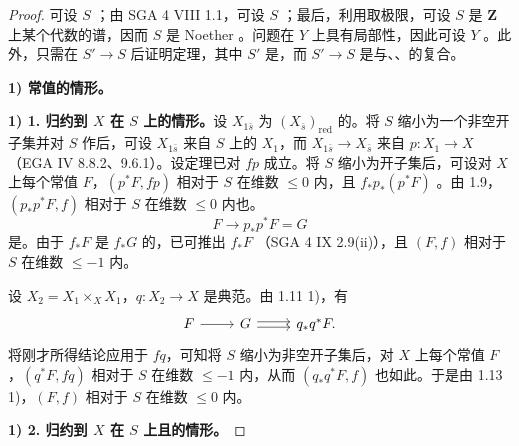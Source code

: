 \begin{proof}
可设 $S$ ；由 SGA 4 VIII 1.1，可设 $S$ ；最后，利用取极限，可设 $S$ 是 $\mathbf Z$ 上某个代数的谱，因而 $S$ 是 Noether 。问题在 $Y$ 上具有局部性，因此可设 $Y$ 。此外，只需在 $S'\to S$ 后证明定理，其中 $S'$ 是，而 $S'\to S$ 是与、、的复合。

\textbf{1) 常值的情形。}

\textbf{1) 1. 归约到 $X$ 在 $S$ 上的情形。}设 $X_{1\bar s}$ 为 $(X_{\bar s})_{\mathrm{red}}$ 的。将 $S$ 缩小为一个非空开子集并对 $S$ 作后，可设 $X_{1\bar s}$ 来自 $S$ 上的 $X_1$，而 $X_{1\bar s}\to X_{\bar s}$ 来自
$p:X_1\to X$（EGA IV 8.8.2、9.6.1）。设定理已对 $fp$ 成立。将 $S$ 缩小为开子集后，可设对 $X$ 上每个常值 $F$，$(p^*F,fp)$ 相对于 $S$ 在维数 $\leq0$ 内，且 $f_*p_*(p^*F)$ 。由 1.9，$(p_*p^*F,f)$ 相对于 $S$ 在维数 $\leq0$ 内也。
\[
 F\longrightarrow p_*p^*F=G
\]
是。由于 $f_*F$ 是 $f_*G$ 的，已可推出 $f_*F$ （SGA 4 IX 2.9(ii)），且 $(F,f)$ 相对于 $S$ 在维数 $\leq-1$ 内。

设 $X_2=X_1\times_X X_1$，$q:X_2\to X$ 是典范。由 1.11 1)，有
\[
\begin{tikzcd}
F\arrow[r]&G\arrow[r,shift left=.45ex]\arrow[r,shift right=.45ex]&q_*q^*F.
\end{tikzcd}
\]
将刚才所得结论应用于 $fq$，可知将 $S$ 缩小为非空开子集后，对 $X$ 上每个常值 $F$，$(q^*F,fq)$ 相对于 $S$ 在维数 $\leq-1$ 内，从而 $(q_*q^*F,f)$ 也如此。于是由 1.13 1)，$(F,f)$ 相对于 $S$ 在维数 $\leq0$ 内。

\textbf{1) 2. 归约到 $X$ 在 $S$ 上且的情形。}


\end{proof}
